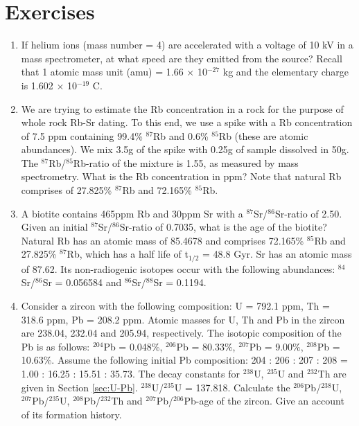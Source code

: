 \chapter{Exercises}
\label{sec:exercises}

\begin{enumerate}

\item If helium ions (mass number = 4) are accelerated with a voltage
  of 10 kV in a mass spectrometer, at what speed are they emitted from
  the source? Recall that 1 atomic mass unit (amu) = 1.66 $\times$
  10$^{-27}$ kg and the elementary charge is 1.602 $\times$ 10$^{-19}$
  C. 

\item We are trying to estimate the Rb concentration in a rock for the
  purpose of whole rock Rb-Sr dating. To this end, we use a spike with
  a Rb concentration of 7.5 ppm containing 99.4\% $^{87}$Rb and 0.6\%
  $^{85}$Rb (these are atomic abundances). We mix 3.5g of the spike
  with 0.25g of sample dissolved in 50g. The $^{87}$Rb/$^{85}$Rb-ratio
  of the mixture is 1.55, as measured by mass spectrometry. What is
  the Rb concentration in ppm? Note that natural Rb comprises of
  27.825\% $^{87}$Rb and 72.165\% $^{85}$Rb.  

\item A biotite contains 465ppm Rb and 30ppm Sr with a
  $^{87}$Sr/$^{86}$Sr-ratio of 2.50.  Given an initial
  $^{87}$Sr/$^{86}$Sr-ratio of 0.7035, what is the age of the biotite?
  Natural Rb has an atomic mass of 85.4678 and comprises 72.165\%
  $^{85}$Rb and 27.825\% $^{87}$Rb, which has a half life of t$_{1/2}$
  = 48.8 Gyr. Sr has an atomic mass of 87.62. Its non-radiogenic
  isotopes occur with the following abundances: $^{84}$Sr/$^{86}$Sr =
  0.056584 and $^{86}$Sr/$^{88}$Sr = 0.1194.

\item Consider a zircon with the following composition: U = 792.1 ppm,
  Th = 318.6 ppm, Pb = 208.2 ppm. Atomic masses for U, Th and Pb in
  the zircon are 238.04, 232.04 and 205.94, respectively. The isotopic
  composition of the Pb is as follows: $^{204}$Pb = 0.048\%,
  $^{206}$Pb = 80.33\%, $^{207}$Pb = 9.00\%, $^{208}$Pb =
  10.63\%. Assume the following initial Pb composition: 204 : 206 :
  207 : 208 = 1.00 : 16.25 : 15.51 : 35.73. The decay constants for
  $^{238}$U, $^{235}$U and $^{232}$Th are given in Section
  \ref{sec:U-Pb}. $^{238}$U/$^{235}$U = 137.818. Calculate the
  $^{206}$Pb/$^{238}$U, $^{207}$Pb/$^{235}$U, $^{208}$Pb/$^{232}$Th
  and $^{207}$Pb/$^{206}$Pb-age of the zircon. Give an account of its
  formation history. \\ 


\end{enumerate}
